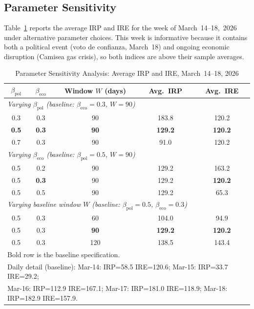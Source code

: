 \documentclass[12pt,a4paper]{article}
\begin{document}
\subsection{Parameter Sensitivity}
\label{subsec:sensitivity}

Table~\ref{tab:sensitivity} reports the average IRP and IRE for the week of
March~14--18,~2026 under alternative parameter choices.  This week is
informative because it contains both a political event (voto de confianza,
March~18) and ongoing economic disruption (Camisea gas crisis), so both
indices are above their sample averages.

\begin{table}[h!]
\centering
\caption{Parameter Sensitivity Analysis: Average IRP and IRE, March~14--18, 2026}
\label{tab:sensitivity}
\small
\begin{tabular}{ccccc}
\toprule
$\beta_{\text{pol}}$ & $\beta_{\text{eco}}$ & Window $W$ (days) & Avg.\ IRP & Avg.\ IRE \\
\midrule
\multicolumn{5}{l}{\textit{Varying $\beta_{\text{pol}}$ (baseline: $\beta_{\text{eco}}=0.3$, $W=90$)}} \\
0.3 & 0.3 & 90 & 183.8 & 120.2 \\
\textbf{0.5} & \textbf{0.3} & \textbf{90} & \textbf{129.2} & \textbf{120.2} \\
0.7 & 0.3 & 90 &  91.0 & 120.2 \\
\midrule
\multicolumn{5}{l}{\textit{Varying $\beta_{\text{eco}}$ (baseline: $\beta_{\text{pol}}=0.5$, $W=90$)}} \\
0.5 & 0.2 & 90 & 129.2 & 163.2 \\
0.5 & \textbf{0.3} & 90 & 129.2 & \textbf{120.2} \\
0.5 & 0.5 & 90 & 129.2 &  65.3 \\
\midrule
\multicolumn{5}{l}{\textit{Varying baseline window $W$ (baseline: $\beta_{\text{pol}}=0.5$, $\beta_{\text{eco}}=0.3$)}} \\
0.5 & 0.3 &  60 & 104.0 &  94.9 \\
0.5 & 0.3 & \textbf{90}  & \textbf{129.2} & \textbf{120.2} \\
0.5 & 0.3 & 120 & 138.5 & 143.4 \\
\bottomrule
\multicolumn{5}{l}{\footnotesize Bold row is the baseline specification.}\\
\multicolumn{5}{l}{\footnotesize Daily detail (baseline): Mar-14: IRP=58.5 IRE=120.6; Mar-15: IRP=33.7 IRE=29.2;}\\
\multicolumn{5}{l}{\footnotesize Mar-16: IRP=112.9 IRE=167.1; Mar-17: IRP=181.0 IRE=118.9; Mar-18: IRP=182.9 IRE=157.9.}
\end{tabular}
\end{table}
\end{document}
